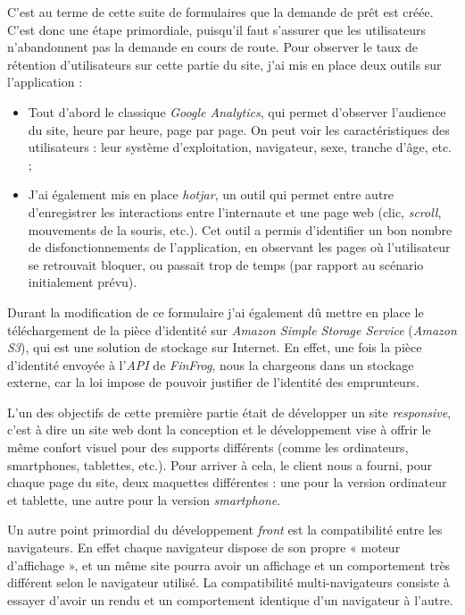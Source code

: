 \bigskip

C'est au terme de cette suite de formulaires que la demande de prêt est
créée. C'est donc une étape primordiale, puisqu'il faut s'assurer que
les utilisateurs n'abandonnent pas la demande en cours de route. Pour
observer le taux de rétention d'utilisateurs sur cette partie du site,
j'ai mis en place deux outils sur l'application :

\begin{itemize}
\tightlist
\item
  Tout d'abord le classique \emph{Google Analytics}, qui permet
  d'observer l'audience du site, heure par heure, page par page. On peut
  voir les caractéristiques des utilisateurs : leur système
  d'exploitation, navigateur, sexe, tranche d'âge, etc. ;
\item
  J'ai également mis en place \emph{hotjar}, un outil qui permet entre
  autre d'enregistrer les interactions entre l'internaute et une page
  web (clic, \emph{scroll}, mouvements de la souris, etc.). Cet outil a
  permis d'identifier un bon nombre de disfonctionnements de
  l'application, en observant les pages où l'utilisateur se retrouvait
  bloquer, ou passait trop de temps (par rapport au scénario
  initialement prévu).
\end{itemize}

\bigskip

Durant la modification de ce formulaire j'ai également dû mettre en
place le téléchargement de la pièce d'identité sur \emph{Amazon Simple
Storage Service} (\emph{Amazon S3}), qui est une solution de stockage
sur Internet. En effet, une fois la pièce d'identité envoyée à
l'\emph{API} de \emph{FinFrog}, nous la chargeons dans un stockage
externe, car la loi impose de pouvoir justifier de l'identité des
emprunteurs.

\bigskip

L'un des objectifs de cette première partie était de développer un site
\emph{responsive}, c'est à dire un site web dont la conception et le
développement vise à offrir le même confort visuel pour des supports
différents (comme les ordinateurs, smartphones, tablettes, etc.). Pour
arriver à cela, le client nous a fourni, pour chaque page du site, deux
maquettes différentes : une pour la version ordinateur et tablette, une
autre pour la version \emph{smartphone}.

\bigskip

Un autre point primordial du développement \emph{front} est la
compatibilité entre les navigateurs. En effet chaque navigateur dispose
de son propre « moteur d'affichage », et un même site pourra avoir un
affichage et un comportement très différent selon le navigateur utilisé.
La compatibilité multi-navigateurs consiste à essayer d'avoir un rendu
et un comportement identique d'un navigateur à l'autre.

